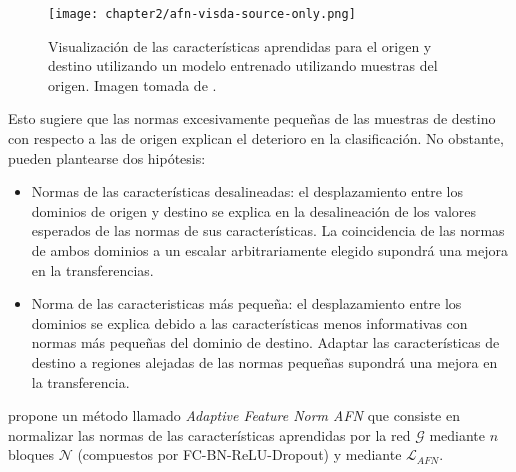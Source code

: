 \begin{figure}[H]
    \centering
    \texttt{[image: chapter2/afn-visda-source-only.png]}

    \caption{Visualizaci\'on de las características aprendidas para el origen y destino utilizando un modelo entrenado utilizando muestras del origen. Imagen tomada de \cite{xu2019larger}.}
    \label{fig:afn-source-only}
\end{figure}

Esto sugiere que las normas excesivamente pequeñas de las muestras de destino con respecto a las de origen explican el
deterioro en la clasificación. No obstante, pueden plantearse dos hipótesis:

\begin{itemize}
    \item Normas de las características desalineadas: el desplazamiento entre los dominios de origen y destino se explica en la
          desalineación de los valores esperados de las normas de sus características. La coincidencia de las normas de ambos
          dominios a un escalar arbitrariamente elegido supondrá una mejora en la transferencias.
    \item Norma de las caracteristicas más pequeña: el desplazamiento entre los dominios se explica debido a las características
          menos informativas con normas más pequeñas del dominio de destino. Adaptar las características de destino a regiones
          alejadas de las normas pequeñas supondrá una mejora en la transferencia.
\end{itemize}

\cite{xu2019larger} propone un método llamado {\it Adaptive Feature Norm AFN} que consiste en normalizar las normas de las características aprendidas por la red $\mathcal{G}$  mediante $n$ bloques $\mathcal{N}$ (compuestos por FC-BN-ReLU-Dropout) y mediante $\mathcal{L}_{AFN}$.

